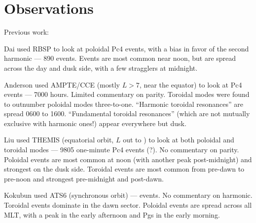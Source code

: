 


\chapter{Observations}
  \label{ch_rbsp}




Previous work:

Dai\cite{dai_2015} used RBSP to look at poloidal Pc4 events, with a bias in favor of the second harmonic --- 890 events. Events are most common near noon, but are spread across the day and dusk side, with a few stragglers at midnight. 

Anderson\cite{anderson_1990} used AMPTE/CCE (mostly $L>7$, near the equator) to look at Pc4 events --- 7000 hours. Limited commentary on parity. Toroidal modes were found to outnumber poloidal modes three-to-one. ``Harmonic toroidal resonances'' are spread 0600 to 1600. ``Fundamental toroidal resonances'' (which are not mutually exclusive with harmonic ones!) appear everywhere but dusk. 

Liu\cite{liu_2009} used THEMIS (equatorial orbit, $L$ out to ) to look at both poloidal and toroidal modes --- 9805 one-minute Pc4 events (?). No commentary on parity. Poloidal events are most common at noon (with another peak post-midnight) and strongest on the dusk side. Toroidal events are most common from pre-dawn to pre-noon and strongest pre-midnight and post-dawn. 

Kokubun\cite{kokubun_1989} used ATS6 (synchronous orbit) ---  events. No commentary on harmonic. Toroidal events dominate in the dawn sector. Poloidal events are spread across all MLT, with a peak in the early afternoon and Pgs in the early morning. 

